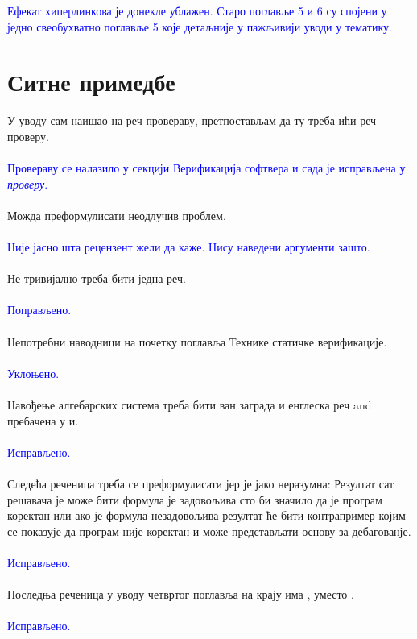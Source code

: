 \documentclass[a4paper]{report}
\newcommand{\odgovor}[1]{\textcolor{blue}{#1}}
\begin{document}
\odgovor{Ефекат хиперлинкова је донекле ублажен. Старо поглавље 5 и 6 су спојени у једно свеобухватно поглавље 5 које детаљније у пажљивији уводи у тематику.}

\section{Ситне примедбе}
У уводу сам наишао на реч провераву, претпостављам да ту треба ићи реч проверу.
    \\\\
    \odgovor{Провераву се налазило у секцији Верификација софтвера и сада је исправљена у \emph{проверу}.} 
	\\\\
Можда преформулисати неодлучив проблем.
    \\\\
    \odgovor{Није јасно шта рецензент жели да каже. Нису наведени аргументи зашто.} 
	\\\\
Не тривијално треба бити једна реч.
    \\\\
    \odgovor{Поправљено.} 
	\\\\
Непотребни наводници на почетку поглавља Технике статичке верификације.
    \\\\
    \odgovor{Уклоњено.} 
	\\\\
Навођење алгебарских система треба бити ван заграда и енглеска реч and пребачена у и.
    \\\\
    \odgovor{Исправљено.} 
	\\\\
Следећа реченица треба се преформулисати јер је јако неразумна: Резултат сат решавача је може бити формула је задовољива сто би значило да је програм коректан или ако је формула незадовољива резултат ће бити контрапример којим се показује да програм није коректан и може представљати основу за дебагованје. 
    \\\\
    \odgovor{Исправљено.} 
	\\\\
Последња реченица у уводу четвртог поглавља на крају има , уместо .
    \\\\
    \odgovor{Исправљено.} 
	\\\\
\end{document}
